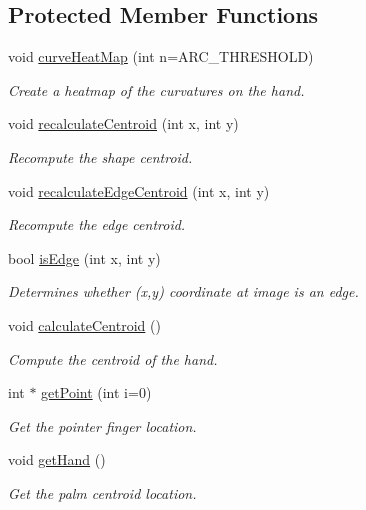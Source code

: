 \subsection*{Protected Member Functions}
\begin{DoxyCompactItemize}
\item 
void \hyperlink{class_hand_ae3d90ae264631ad6af2efbb5baddfda6}{curve\+Heat\+Map} (int n=A\+R\+C\+\_\+\+T\+H\+R\+E\+S\+H\+O\+LD)
\begin{DoxyCompactList}\small\item\em Create a heatmap of the curvatures on the hand. \end{DoxyCompactList}\item 
void \hyperlink{class_hand_a8d3f0317f1b0e2edd9e89d679e616fbc}{recalculate\+Centroid} (int x, int y)
\begin{DoxyCompactList}\small\item\em Recompute the shape centroid. \end{DoxyCompactList}\item 
void \hyperlink{class_hand_a3af95101a355738577be20c734a46bf0}{recalculate\+Edge\+Centroid} (int x, int y)
\begin{DoxyCompactList}\small\item\em Recompute the edge centroid. \end{DoxyCompactList}\item 
bool \hyperlink{class_hand_a3c9f87cf116838082875016e459127ae}{is\+Edge} (int x, int y)
\begin{DoxyCompactList}\small\item\em Determines whether (x,y) coordinate at image is an edge. \end{DoxyCompactList}\item 
\hypertarget{class_hand_aaa3e2992447d5cb16b0c9095028b07c0}{}\label{class_hand_aaa3e2992447d5cb16b0c9095028b07c0} 
void \hyperlink{class_hand_aaa3e2992447d5cb16b0c9095028b07c0}{calculate\+Centroid} ()
\begin{DoxyCompactList}\small\item\em Compute the centroid of the hand. \end{DoxyCompactList}\item 
\hypertarget{class_hand_a0d6fb9c0c195ef544e36e6dfe6621bbb}{}\label{class_hand_a0d6fb9c0c195ef544e36e6dfe6621bbb} 
int $\ast$ \hyperlink{class_hand_a0d6fb9c0c195ef544e36e6dfe6621bbb}{get\+Point} (int i=0)
\begin{DoxyCompactList}\small\item\em Get the pointer finger location. \end{DoxyCompactList}\item 
\hypertarget{class_hand_ac55aeccf6d1c8e2aa8105d334cdf1339}{}\label{class_hand_ac55aeccf6d1c8e2aa8105d334cdf1339} 
void \hyperlink{class_hand_ac55aeccf6d1c8e2aa8105d334cdf1339}{get\+Hand} ()
\begin{DoxyCompactList}\small\item\em Get the palm centroid location. \end{DoxyCompactList}\end{DoxyCompactItemize}
